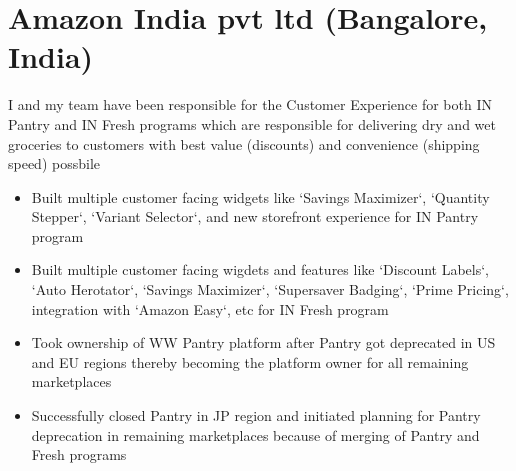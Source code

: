 \documentclass[11pt,a4paper,sans]{moderncv} %
\begin{document}
\section{Amazon India pvt ltd (Bangalore, India)}
         {I and my team have been responsible for the Customer Experience for both IN Pantry and IN Fresh programs which are responsible for delivering dry and wet groceries to customers with best value (discounts) and convenience (shipping speed) possbile
           \begin{itemize}
           \item Built multiple customer facing widgets like `Savings Maximizer`, `Quantity Stepper`, `Variant Selector`, and new storefront experience for IN Pantry program
           \item Built multiple customer facing wigdets and features like `Discount Labels`, `Auto Herotator`, `Savings Maximizer`, `Supersaver Badging`, `Prime Pricing`, integration with `Amazon Easy`, etc for IN Fresh program
           \item Took ownership of WW Pantry platform after Pantry got deprecated in US and EU regions thereby becoming the platform owner for all remaining marketplaces
           \item Successfully closed Pantry in JP region and initiated planning for Pantry deprecation in remaining marketplaces because of merging of Pantry and Fresh programs
         \end{itemize}}
\end{document}

